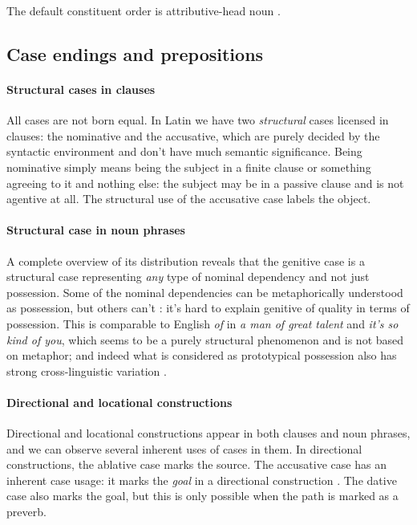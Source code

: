 \documentclass[a4paper, oneside, 12pt]{report}
\newcommand*{\citepage}[1]{p.~{#1}}
\newcommand*{\citepages}[1]{pp.~{#1}}
\newcommand*{\term}[1]{\emph{#1}}
\newcommand{\form}[1]{\emph{#1}}
\begin{document}
The default constituent order is attributive-head noun
\citep[\citepage{396}]{allen1903allen}.


\subsection{Case endings and prepositions}\label{sec:grammatical.np.case}

\paragraph*{Structural cases in clauses}
All cases are not born equal. 
In Latin we have two \emph{structural} cases licensed in clauses: the nominative and the accusative,
which are purely decided by the syntactic environment 
and don't have much semantic significance.
Being nominative simply means being the subject in a finite clause or something agreeing to it 
and nothing else: 
the subject may be in a passive clause and is not agentive at all.
The structural use of the accusative case labels the object.

\paragraph*{Structural case in noun phrases}
A complete overview of its distribution reveals that 
the genitive case is a structural case 
representing \emph{any} type of nominal dependency 
and not just possession.
Some of the nominal dependencies can be 
metaphorically understood as possession, 
but others can't \citep[\citepage{244}]{oniga2014latin}:
it's hard to explain genitive of quality 
in terms of possession.
This is comparable to English \form{of}
in \form{a man of great talent} and \form{it's so kind of you},
which seems to be a purely structural phenomenon
and is not based on metaphor;
and indeed what is considered as prototypical possession 
also has strong cross-linguistic variation 
\citep[\citepages{262-263}]{dixon2010basic2}.

\paragraph*{Directional and locational constructions}
Directional and locational constructions appear in both clauses and noun phrases,
and we can observe several inherent uses of cases in them.
In directional constructions, the ablative case marks the source.
The accusative case has an inherent case usage:
it marks the \term{goal} in a directional construction
\citep[\citepage{238}]{oniga2014latin}.
The dative case also marks the goal,
but this is only possible when the path is marked as a preverb.
\end{document}
